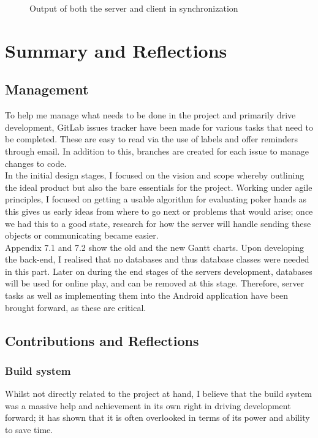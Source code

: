 \documentclass[11pt]{article}
\begin{document}
\begin{figure}[h]
	\caption{Output of both the server and client in synchronization}
\end{figure}


\newpage
\section{Summary and Reflections}
\subsection{Management}
To help me manage what needs to be done in the project and primarily drive development, GitLab issues tracker have been made for various tasks that need to be completed. These are easy to read via the use of labels and offer reminders through email. In addition to this, branches are created for each issue to manage changes to code. \\

In the initial design stages, I focused on the vision and scope whereby outlining the ideal product but also the bare essentials for the project. Working under agile principles, I focused on getting a usable algorithm for evaluating poker hands as this gives us early ideas from where to go next or problems that would arise; once we had this to a good state, research for how the server will handle sending these objects or communicating became easier.  \\

Appendix 7.1 and 7.2 show the old and the new Gantt charts. Upon developing the back-end, I realised that no databases and thus database classes were needed in this part. Later on during the end stages of the servers development, databases will be used for online play, and can be removed at this stage. Therefore, server tasks as well as implementing them into the Android application have been brought forward, as these are critical.  \\

\subsection{Contributions and Reflections}

\subsubsection{Build system}
Whilst not directly related to the project at hand, I believe that the build system was a massive help and achievement in its own right in driving development forward; it has shown that it is often overlooked in terms of its power and ability to save time. \\
\end{document}
